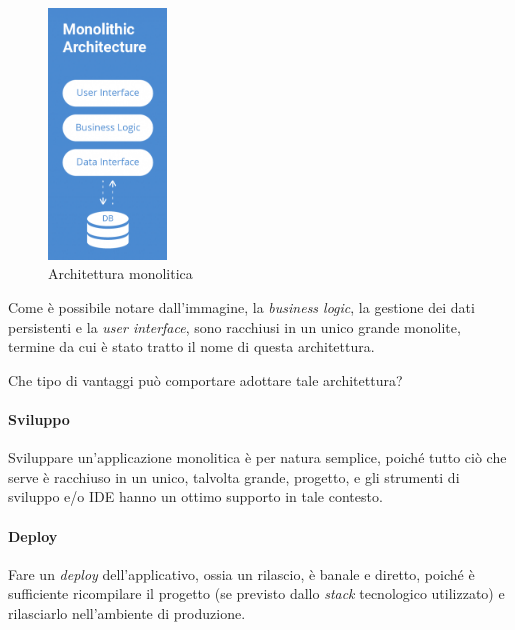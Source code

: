 \begin{figure}[H]
	\centering
	\includegraphics[width=0.28\textwidth]{immagini/monolithic_architectureB.png} %
	\caption[Architettura monolitica]{Architettura monolitica\footnotemark}
	\label{fig:monolithic-arch}
\end{figure}

Come è possibile notare dall'immagine, la \textit{business logic}, la gestione dei dati persistenti e la \textit{user interface}, sono racchiusi in un unico grande monolite, termine da cui è stato tratto il nome di questa architettura.

Che tipo di vantaggi può comportare adottare tale architettura?


\paragraph*{Sviluppo} Sviluppare un'applicazione monolitica è per natura semplice, poiché tutto ciò che serve è racchiuso in un unico, talvolta grande, progetto, e gli strumenti di sviluppo e/o IDE 
hanno un ottimo supporto in tale contesto.

\paragraph*{Deploy} Fare un \textit{deploy} dell'applicativo, ossia un rilascio, è banale e diretto, poiché è sufficiente ricompilare il progetto (se previsto dallo \textit{stack} tecnologico utilizzato) e rilasciarlo nell'ambiente di produzione.

